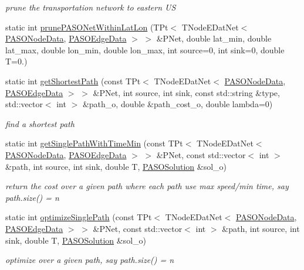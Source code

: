 \begin{DoxyCompactItemize}
\begin{DoxyCompactList}\small\item\em prune the transportation network to eastern U\+S \end{DoxyCompactList}\item 
static int \hyperlink{class_p_a_s_o_util_a8ac99fd1ffb87466d5169d9984079293}{prune\+P\+A\+S\+O\+Net\+Within\+Lat\+Lon} (T\+Pt$<$ T\+Node\+E\+Dat\+Net$<$ \hyperlink{class_p_a_s_o_node_data}{P\+A\+S\+O\+Node\+Data}, \hyperlink{class_p_a_s_o_edge_data}{P\+A\+S\+O\+Edge\+Data} $>$ $>$ \&P\+Net, double lat\+\_\+min, double lat\+\_\+max, double lon\+\_\+min, double lon\+\_\+max, int source=0, int sink=0, double T=0.)
\item 
static int \hyperlink{class_p_a_s_o_util_a0e0a5a22a5001191a5eb1f786aefae63}{get\+Shortest\+Path} (const T\+Pt$<$ T\+Node\+E\+Dat\+Net$<$ \hyperlink{class_p_a_s_o_node_data}{P\+A\+S\+O\+Node\+Data}, \hyperlink{class_p_a_s_o_edge_data}{P\+A\+S\+O\+Edge\+Data} $>$ $>$ \&P\+Net, int source, int sink, const std\+::string \&type, std\+::vector$<$ int $>$ \&path\+\_\+o, double \&path\+\_\+cost\+\_\+o, double lambda=0)
\begin{DoxyCompactList}\small\item\em find a shortest path \end{DoxyCompactList}\item 
static int \hyperlink{class_p_a_s_o_util_ad73296f8ede82d7ad8b161e6b0734136}{get\+Single\+Path\+With\+Time\+Min} (const T\+Pt$<$ T\+Node\+E\+Dat\+Net$<$ \hyperlink{class_p_a_s_o_node_data}{P\+A\+S\+O\+Node\+Data}, \hyperlink{class_p_a_s_o_edge_data}{P\+A\+S\+O\+Edge\+Data} $>$ $>$ \&P\+Net, const std\+::vector$<$ int $>$ \&path, int source, int sink, double T, \hyperlink{class_p_a_s_o_solution}{P\+A\+S\+O\+Solution} \&sol\+\_\+o)
\begin{DoxyCompactList}\small\item\em return the cost over a given path where each path use max speed/min time, say path.\+size() = n \end{DoxyCompactList}\item 
static int \hyperlink{class_p_a_s_o_util_a2e6aa4dea9894893d2659d9d44d1a695}{optimize\+Single\+Path} (const T\+Pt$<$ T\+Node\+E\+Dat\+Net$<$ \hyperlink{class_p_a_s_o_node_data}{P\+A\+S\+O\+Node\+Data}, \hyperlink{class_p_a_s_o_edge_data}{P\+A\+S\+O\+Edge\+Data} $>$ $>$ \&P\+Net, const std\+::vector$<$ int $>$ \&path, int source, int sink, double T, \hyperlink{class_p_a_s_o_solution}{P\+A\+S\+O\+Solution} \&sol\+\_\+o)
\begin{DoxyCompactList}\small\item\em optimize over a given path, say path.\+size() = n \end{DoxyCompactList}\item 

\end{DoxyCompactItemize}

